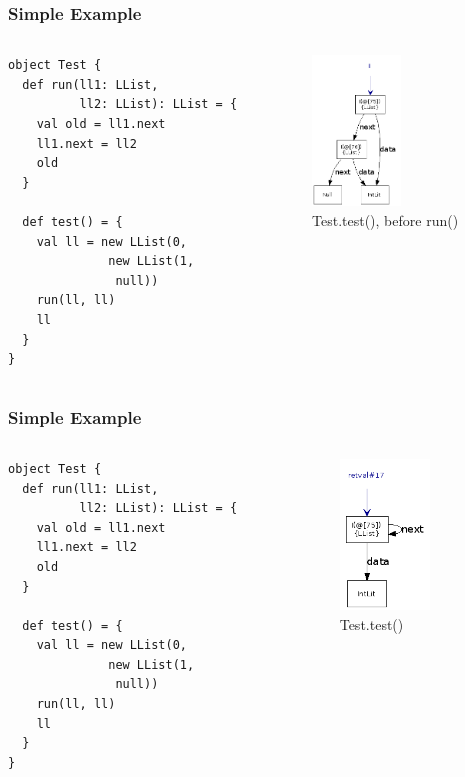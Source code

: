 \documentclass[hyperref={pdfpagelabels=false}]{beamer}
\begin{document}
\begin{frame}[fragile]
\frametitle{Simple Example}
  \begin{columns}
    \begin{column}{0.4\textwidth}
\begin{lstlisting}
object Test {
  def run(ll1: LList,
          ll2: LList): LList = {
    val old = ll1.next
    ll1.next = ll2
    old
  }

  def test() = {
    val ll = new LList(0,
              new LList(1,
               null))
    run(ll, ll)
    ll
  }
}
\end{lstlisting}
    \end{column}
    \begin{column}{0.6\textwidth}
      \begin{figure}[t]
        \includegraphics[height=40mm]{images/e1-bef.png}\\
        Test.test(), before run()
      \end{figure}
    \end{column}
  \end{columns}
\end{frame}

\begin{frame}[fragile]
\frametitle{Simple Example}
  \begin{columns}
    \begin{column}{0.4\textwidth}
\begin{lstlisting}
object Test {
  def run(ll1: LList,
          ll2: LList): LList = {
    val old = ll1.next
    ll1.next = ll2
    old
  }

  def test() = {
    val ll = new LList(0,
              new LList(1,
               null))
    run(ll, ll)
    ll
  }
}
\end{lstlisting}
    \end{column}
    \begin{column}{0.6\textwidth}
      \begin{figure}[t]
        \includegraphics[height=40mm]{images/e1-res.png}\\
        Test.test()
      \end{figure}
    \end{column}
  \end{columns}
\end{frame}
\end{document}
